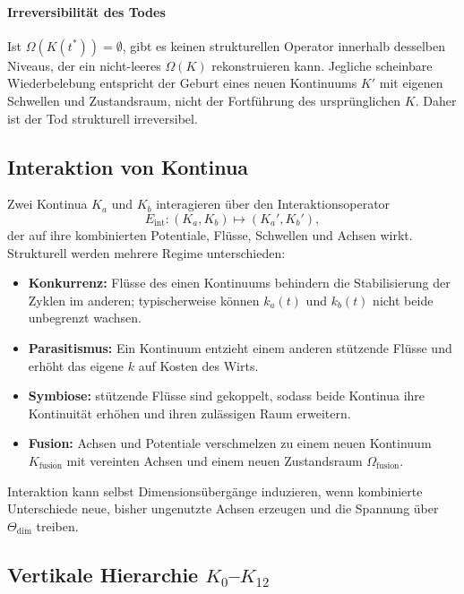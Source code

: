 \paragraph{Irreversibilität des Todes}
Ist \(\Omega(K(t^\ast)) = \emptyset\), gibt es keinen strukturellen Operator
innerhalb desselben Niveaus, der ein nicht-leeres \(\Omega(K)\) rekonstruieren
kann.
Jegliche scheinbare Wiederbelebung entspricht der Geburt eines neuen
Kontinuums \(K'\) mit eigenen Schwellen und Zustandsraum, nicht der
Fortführung des ursprünglichen \(K\).
Daher ist der Tod strukturell irreversibel.

\subsection{Interaktion von Kontinua}

Zwei Kontinua \(K_a\) und \(K_b\) interagieren über den
Interaktionsoperator
\[
    E_{\mathrm{int}} : (K_a,K_b) \mapsto (K_a',K_b'),
\]
der auf ihre kombinierten Potentiale, Flüsse, Schwellen und Achsen wirkt.
Strukturell werden mehrere Regime unterschieden:

\begin{itemize}
    \item \textbf{Konkurrenz:} Flüsse des einen Kontinuums behindern die
          Stabilisierung der Zyklen im anderen; typischerweise können
          \(k_a(t)\) und \(k_b(t)\) nicht beide unbegrenzt wachsen.
    \item \textbf{Parasitismus:} Ein Kontinuum entzieht einem anderen
          stützende Flüsse und erhöht das eigene \(k\) auf Kosten des Wirts.
    \item \textbf{Symbiose:} stützende Flüsse sind gekoppelt, sodass beide
          Kontinua ihre Kontinuität erhöhen und ihren zulässigen Raum
          erweitern.
    \item \textbf{Fusion:} Achsen und Potentiale verschmelzen zu einem neuen
          Kontinuum \(K_{\mathrm{fusion}}\) mit vereinten Achsen und einem neuen
          Zustandsraum \(\Omega_{\mathrm{fusion}}\).
\end{itemize}

Interaktion kann selbst Dimensionsübergänge induzieren, wenn kombinierte
Unterschiede neue, bisher ungenutzte Achsen erzeugen und die Spannung über
\(\Theta_{\mathrm{dim}}\) treiben.

\subsection{Vertikale Hierarchie \texorpdfstring{$K_0$–$K_{12}$}{K0--K12}}

